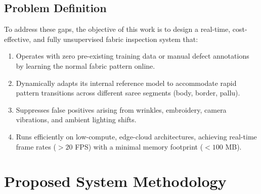 \documentclass{ieeeaccess}
\begin{document}
\subsection{Problem Definition}
To address these gaps, the objective of this work is to design a real-time, cost-effective, and fully unsupervised fabric inspection system that:
\begin{enumerate}
    \item Operates with zero pre-existing training data or manual defect annotations by learning the normal fabric pattern online.
    \item Dynamically adapts its internal reference model to accommodate rapid pattern transitions across different saree segments (body, border, pallu).
    \item Suppresses false positives arising from wrinkles, embroidery, camera vibrations, and ambient lighting shifts.
    \item Runs efficiently on low-compute, edge-cloud architectures, achieving real-time frame rates ($>20$ FPS) with a minimal memory footprint ($<100$ MB).
\end{enumerate}

\section{Proposed System Methodology}
\end{document}

